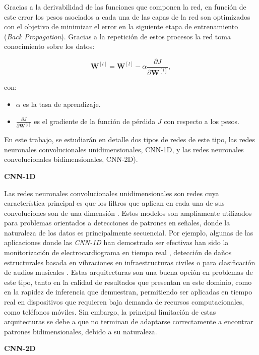 Gracias a la derivabilidad de las funciones que componen la red, en función de este error los pesos asociados a cada una de las capas de la red son optimizados con el objetivo de minimizar el error en la siguiente etapa de entrenamiento (\textit{Back Propagation}). Gracias a la repetición de estos procesos la red toma conocimiento sobre los datos:

\[
\mathbf{W}^{[l]} = \mathbf{W}^{[l]} - \alpha \frac{\partial J}{\partial \mathbf{W}^{[l]}},
\]

con:
\begin{itemize}
	\item \(\alpha\) es la tasa de aprendizaje.
	\item \(\frac{\partial J}{\partial \mathbf{W}^{[l]}}\) es el gradiente de la función de pérdida \(J\) con respecto a los pesos.
\end{itemize}

En este trabajo, se estudiarán en detalle dos tipos de redes de este tipo, las redes neuronales convolucionales unidimensionales, CNN-1D, y las redes neuronales convolucionales bidimensionales, CNN-2D).

\textbf{CNN-1D}

Las redes neuronales convolucionales unidimensionales son redes cuya característica principal es que los filtros que aplican en cada una de sus convoluciones son de una dimensión \cite{CNN1D}. Estos modelos son ampliamente utilizados para problemas orientados a detecciones de patrones en señales, donde la naturaleza de los datos es principalmente secuencial. Por ejemplo, algunas de las aplicaciones donde las \textit{CNN-1D} han demostrado ser efectivas han sido la monitorización de electrocardiograma en tiempo real \cite{Kiranyaz2017tt}, detección de daños estructurales basada en vibraciones en infraestructuras civiles \cite{khodabandehlou2019vibration} o para clasificación de audios musicales \cite{allamy20211d}. Estas arquitecturas son una buena opción en problemas de este tipo, tanto en la calidad de resultados que presentan en este dominio, como en la rapidez de inferencia que demuestran, permitiendo ser aplicadas en tiempo real en dispositivos que requieren baja demanda de recursos computacionales, como teléfonos móviles. Sin embargo, la principal limitación de estas arquitecturas se debe a que no terminan de adaptarse correctamente a encontrar patrones bidimensionales, debido a su naturaleza.

\textbf{CNN-2D}

